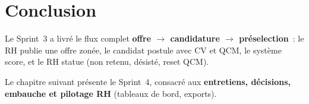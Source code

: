 \section{Conclusion}

Le Sprint~3 a livré le flux complet \textbf{offre $\rightarrow$
candidature $\rightarrow$ préselection}~: le RH publie une offre zonée, le
candidat postule avec CV et QCM, le système score, et le RH statue
(non retenu, désisté, reset QCM).

Le chapitre suivant présente le Sprint~4, consacré aux \textbf{entretiens,
décisions, embauche et pilotage RH} (tableaux de bord, exports).

\clearpage

